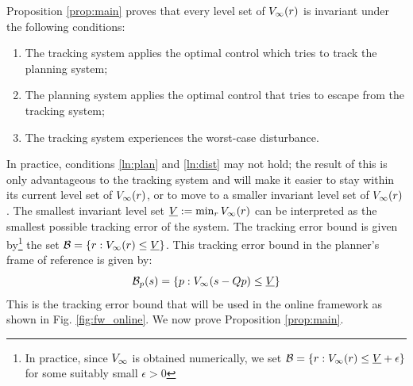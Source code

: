 Proposition \ref{prop:main} proves that every level set of $V_\infty(r)$ is invariant under the following conditions:
\begin{enumerate}
  \item The tracking system applies the optimal control which tries to track the planning system;
  \item The planning system applies the optimal control that tries to escape from the tracking system; \label{ln:plan}
  \item The tracking system experiences the worst-case disturbance. \label{ln:dist}
\end{enumerate}
In practice, conditions \ref{ln:plan} and \ref{ln:dist} may not hold; the result of this is only advantageous to the tracking system and will make it easier to stay within its current level set of $V_\infty(r)$, or to move to a smaller invariant level set of $V_\infty(r)$. The smallest invariant level set $\underline{V} := \min_{r} V_\infty(r)$ can be interpreted as the smallest possible tracking error of the system. The tracking error bound is given by\footnote{In practice, since $V_\infty$ is obtained numerically, we set $\mathcal B = \{r: V_\infty(r) \le \underline{V} + \epsilon\}$ for some suitably small $\epsilon>0$} the set $\mathcal B = \{r: V_\infty(r) \le \underline{V}\}$. This tracking error bound in the planner's frame of reference is given by:
\begin{equation} \label{eq:TEBp}
\mathcal B_p(s) = \{p: V_\infty(s-Qp) \le \underline{V}\}
\end{equation}
This is the tracking error bound that will be used in the online framework as shown in Fig. \ref{fig:fw_online}. We now prove Proposition \ref{prop:main}.

